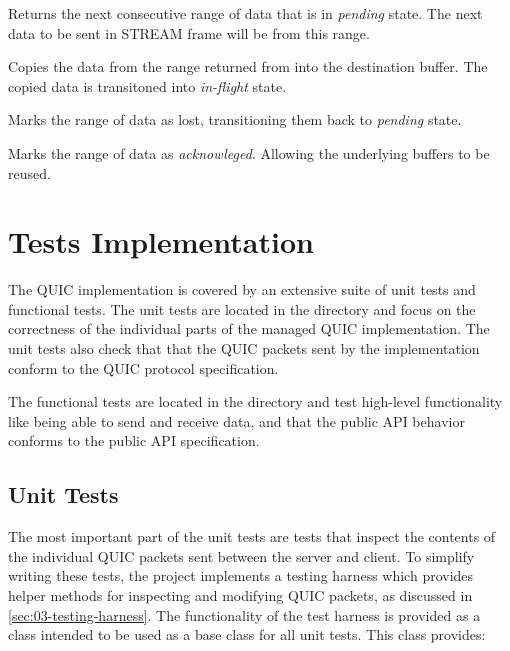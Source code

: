 \begin{description}

        Returns the next consecutive range of data that is in \textit{pending} state. The next data
to be sent in STREAM{} frame will be from this range.

        Copies the data from the range returned from  into the
destination buffer. The copied data is transitoned into \textit{in-flight} state.

        Marks the range of data as lost, transitioning them back to \textit{pending} state.

        Marks the range of data as \textit{acknowleged}. Allowing the underlying buffers to be reused.

\end{description}

\section{Tests Implementation}

The QUIC implementation is covered by an extensive suite of unit tests and functional tests. The
unit tests are located in the  directory and focus on the
correctness of the individual parts of the managed QUIC implementation. The unit tests also check
that that the QUIC packets sent by the implementation conform to the QUIC protocol specification.

The functional tests are located in the
\allowbreak{} directory and test
high-level functionality like being able to send and receive data, and that the public API behavior
conforms to the public API specification.

\subsection{Unit Tests}

The most important part of the unit tests are tests that inspect the contents of the individual QUIC
packets sent between the server and client. To simplify writing these tests, the
 project implements a testing harness which provides helper
methods for inspecting and modifying QUIC packets, as discussed in \autoref{sec:03-testing-harness}.
The functionality of the test harness is provided as a \ManualTransmissionQuicTestBase{} class
intended to be used as a base class for all unit tests. This class provides:

